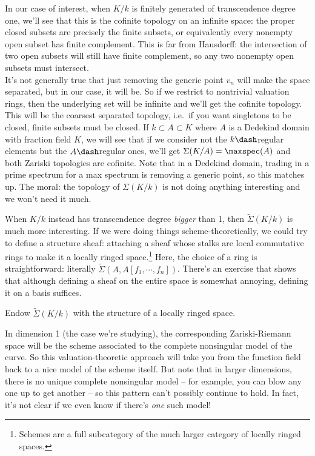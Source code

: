 In our case of interest, when \(K/k\) is finitely generated of
transcendence degree one, we'll see that this is the cofinite topology
on an infinite space: the proper closed subsets are precisely the finite
subsets, or equivalently every nonempty open subset has finite
complement. This is far from Hausdorff: the intersection of two open
subsets will still have finite complement, so any two nonempty open
subsets must intersect.\\

It's not generally true that just removing the generic point \(v_n\)
will make the space separated, but in our case, it will be. So if we
restrict to nontrivial valuation rings, then the underlying set will be
infinite and we'll get the cofinite topology. This will be the coarsest
separated topology, i.e.~if you want singletons to be closed, finite
subsets must be closed. If \(k \subset A \subset K\) where \(A\) is a
Dedekind domain with fraction field \(K\), we will see that if we
consider not the \(k\dash\)regular elements but the \(A\dash\)regular
ones, we'll get \(\Sigma(K/A) = \maxspec(A)\) and both Zariski
topologies are cofinite. Note that in a Dedekind domain, trading in a
prime spectrum for a max spectrum is removing a generic point, so this
matches up. The moral: the topology of \(\Sigma(K/k)\) is not doing
anything interesting and we won't need it much.

When \(K/k\) instead has transcendence degree \emph{bigger} than 1, then
\(\tilde \Sigma(K/k)\) is much more interesting. If we were doing things
scheme-theoretically, we could try to define a structure sheaf:
attaching a sheaf whose stalks are local commutative rings to make it a
locally ringed space.\footnote{Schemes are a full subcategory of the
  much larger category of locally ringed spaces.} Here, the choice of a
ring is straightforward: literally
\(\tilde \Sigma(A, A[f_1, \cdots, f_n])\). There's an exercise that
shows that although defining a sheaf on the entire space is somewhat
annoying, defining it on a basis suffices.

\begin{exercise}[?]

Endow \(\tilde \Sigma(K/k)\) with the structure of a locally ringed
space.

\end{exercise}

\begin{remark}

In dimension 1 (the case we're studying), the corresponding
Zariski-Riemann space will be the scheme associated to the complete
nonsingular model of the curve. So this valuation-theoretic approach
will take you from the function field back to a nice model of the scheme
itself. But note that in larger dimensions, there is no unique complete
nonsingular model -- for example, you can blow any one up to get another
-- so this pattern can't possibly continue to hold. In fact, it's not
clear if we even know if there's \emph{one} such model!

\end{remark}


